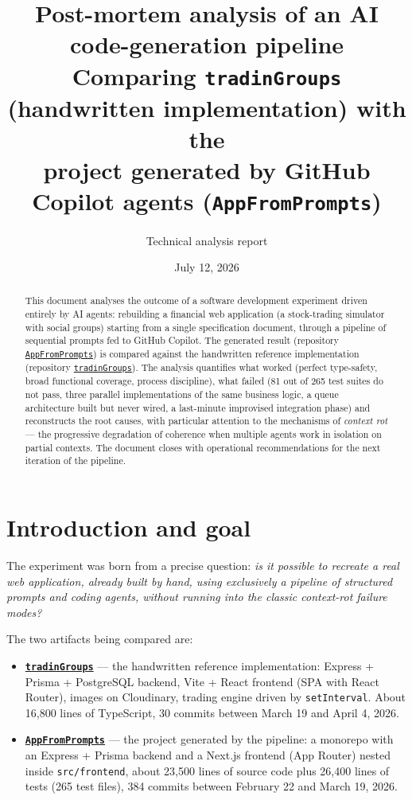 \documentclass[11pt,a4paper]{article}
\title{\textbf{Post-mortem analysis of an AI code-generation pipeline}\\[4pt]
\Large Comparing \texttt{tradinGroups} (handwritten implementation) with the\\
project generated by GitHub Copilot agents (\texttt{AppFromPrompts})}
\author{Technical analysis report}
\date{July 12, 2026}
\newcommand{\file}[1]{\texttt{\small #1}}
\begin{document}
\maketitle

\begin{abstract}
\noindent This document analyses the outcome of a software development experiment driven entirely by AI agents: rebuilding a financial web application (a stock-trading simulator with social groups) starting from a single specification document, through a pipeline of sequential prompts fed to GitHub Copilot. The generated result (repository \href{https://github.com/NECKER55/AppFromPrompts}{\texttt{AppFromPrompts}}) is compared against the handwritten reference implementation (repository \href{https://github.com/NECKER55/tradinGroups}{\texttt{tradinGroups}}). The analysis quantifies what worked (perfect type-safety, broad functional coverage, process discipline), what failed (81 out of 265 test suites do not pass, three parallel implementations of the same business logic, a queue architecture built but never wired, a last-minute improvised integration phase) and reconstructs the root causes, with particular attention to the mechanisms of \emph{context rot} --- the progressive degradation of coherence when multiple agents work in isolation on partial contexts. The document closes with operational recommendations for the next iteration of the pipeline.
\end{abstract}

\tableofcontents
\newpage

\section{Introduction and goal}

The experiment was born from a precise question: \emph{is it possible to recreate a real web application, already built by hand, using exclusively a pipeline of structured prompts and coding agents, without running into the classic context-rot failure modes?}

The two artifacts being compared are:

\begin{itemize}[leftmargin=1.5em]
  \item \textbf{\href{https://github.com/NECKER55/tradinGroups}{\file{tradinGroups}}} --- the handwritten reference implementation: Express + Prisma + PostgreSQL backend, Vite + React frontend (SPA with React Router), images on Cloudinary, trading engine driven by \file{setInterval}. About 16{,}800 lines of TypeScript, 30 commits between March 19 and April 4, 2026.
  \item \textbf{\href{https://github.com/NECKER55/AppFromPrompts}{\file{AppFromPrompts}}} --- the project generated by the pipeline: a monorepo with an Express + Prisma backend and a Next.js frontend (App Router) nested inside \file{src/frontend}, about 23{,}500 lines of source code plus 26{,}400 lines of tests (265 test files), 384 commits between February 22 and March 19, 2026.
\end{itemize}
\end{document}
